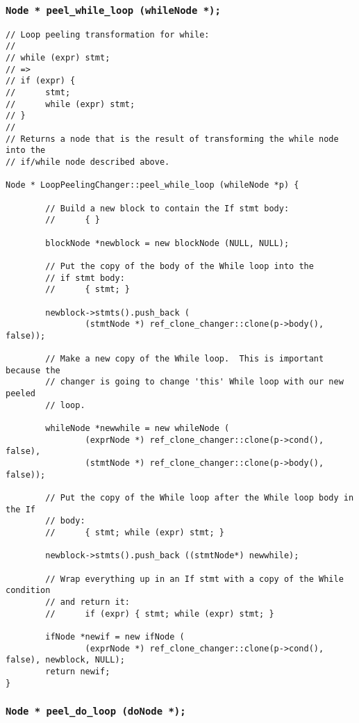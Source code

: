 \documentclass[10pt]{article}
\begin{document}
\subsubsection{{\tt Node * peel\_while\_loop (whileNode *);}}

\begin{small}
\begin{verbatim}
// Loop peeling transformation for while:
//
// while (expr) stmt;
// =>
// if (expr) {
//      stmt;
//      while (expr) stmt;
// }
//
// Returns a node that is the result of transforming the while node into the 
// if/while node described above.

Node * LoopPeelingChanger::peel_while_loop (whileNode *p) {

        // Build a new block to contain the If stmt body:
        //      { }

        blockNode *newblock = new blockNode (NULL, NULL);

        // Put the copy of the body of the While loop into the
        // if stmt body:
        //      { stmt; }

        newblock->stmts().push_back (
                (stmtNode *) ref_clone_changer::clone(p->body(), false));

        // Make a new copy of the While loop.  This is important because the 
        // changer is going to change 'this' While loop with our new peeled 
        // loop.

        whileNode *newwhile = new whileNode (
                (exprNode *) ref_clone_changer::clone(p->cond(), false),
                (stmtNode *) ref_clone_changer::clone(p->body(), false));

        // Put the copy of the While loop after the While loop body in the If 
        // body:
        //      { stmt; while (expr) stmt; }

        newblock->stmts().push_back ((stmtNode*) newwhile);

        // Wrap everything up in an If stmt with a copy of the While condition 
        // and return it:
        //      if (expr) { stmt; while (expr) stmt; }

        ifNode *newif = new ifNode (
                (exprNode *) ref_clone_changer::clone(p->cond(), false), newblock, NULL);
        return newif;
}
\end{verbatim}
\end{small}

\subsubsection{{\tt Node * peel\_do\_loop (doNode *);}}
\end{document}
